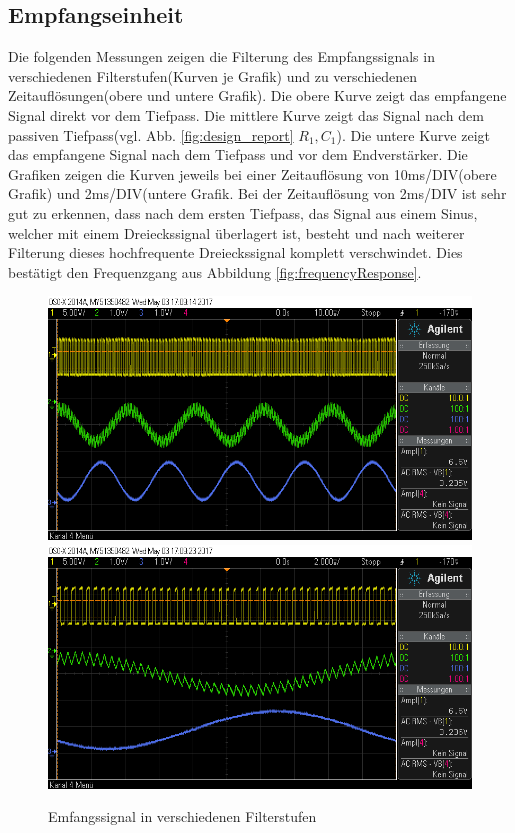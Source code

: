 \subsection{Empfangseinheit}
Die folgenden Messungen zeigen die Filterung des Empfangssignals in verschiedenen Filterstufen(Kurven je Grafik) und zu verschiedenen Zeitauflösung\-en(obere und untere Grafik). Die obere Kurve zeigt das empfangene Signal direkt vor dem Tiefpass. Die mittlere Kurve zeigt das Signal nach dem passiven Tiefpass(vgl. Abb. \ref{fig:design_report} $R_1,C_1$). Die untere Kurve zeigt das empfangene Signal nach dem Tiefpass und vor dem Endverstärker. Die Grafiken zeigen die Kurven jeweils bei einer Zeitauflösung von 10ms/DIV(obere Grafik) und 2ms/DIV(untere Grafik. Bei der Zeitauflösung von 2ms/DIV ist sehr gut zu erkennen, dass nach dem ersten Tiefpass, das Signal aus einem Sinus, welcher mit einem Dreieckssignal überlagert ist, besteht und nach weiterer Filterung dieses hochfrequente Dreieckssignal komplett verschwindet. Dies bestätigt den Frequenzgang aus Abbildung \ref{fig:frequencyResponse}.
\begin{figure}[H]
	\centering
	\includegraphics[scale=0.45]{gfx/osziScreens/scope_10.png}
\includegraphics[scale=0.45]{gfx/osziScreens/scope_11.png}
	\caption{Emfangssignal in verschiedenen Filterstufen}
\end{figure}
